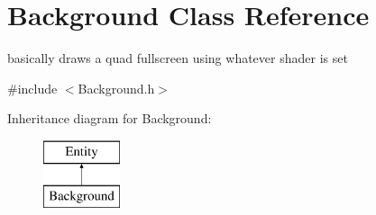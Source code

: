 \hypertarget{class_background}{\section{Background Class Reference}
\label{class_background}
}


basically draws a quad fullscreen using whatever shader is set  




{\ttfamily \#include $<$Background.\-h$>$}

Inheritance diagram for Background\-:\begin{figure}[H]
\begin{center}
\leavevmode
\includegraphics[height=2.000000cm]{class_background}
\end{center}
\end{figure}
